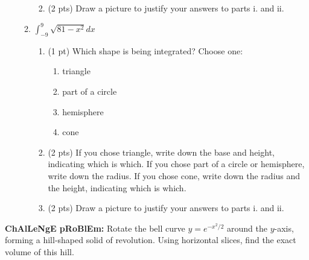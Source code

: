 \documentclass[11pt,letterpaper]{article}
\begin{document}
\begin{enumerate}
\begin{enumerate}
\begin{enumerate}
\vspace{3pc}
\item (2 pts) Draw a picture to justify your answers to parts i. and ii.

\vspace{6pc}
\end{enumerate}

\item $\int_{-9}^9\sqrt{81-x^2}dx$
\smallskip
\begin{enumerate}
\item (1 pt) Which shape is being integrated?  Choose one:
\begin{enumerate}
\item triangle
\item part of a circle
\item hemisphere
\item cone
\end{enumerate}
\smallskip
\item (2 pts) If you chose triangle, write down the base and height, indicating which is which.  If you chose part of a circle or hemisphere, write down the radius.  If you chose cone, write down the radius and the height, indicating which is which.

\vspace{3pc}
\item (2 pts) Draw a picture to justify your answers to parts i. and ii.

\vspace{6pc}
\end{enumerate}

\end{enumerate}

\end{enumerate}

{\bf ChAlLeNgE pRoBlEm:} Rotate the bell curve $y=e^{-x^2/2}$ around the $y$-axis, forming a hill-shaped solid of revolution.  Using horizontal slices, find the exact volume of this hill.
\end{document}
